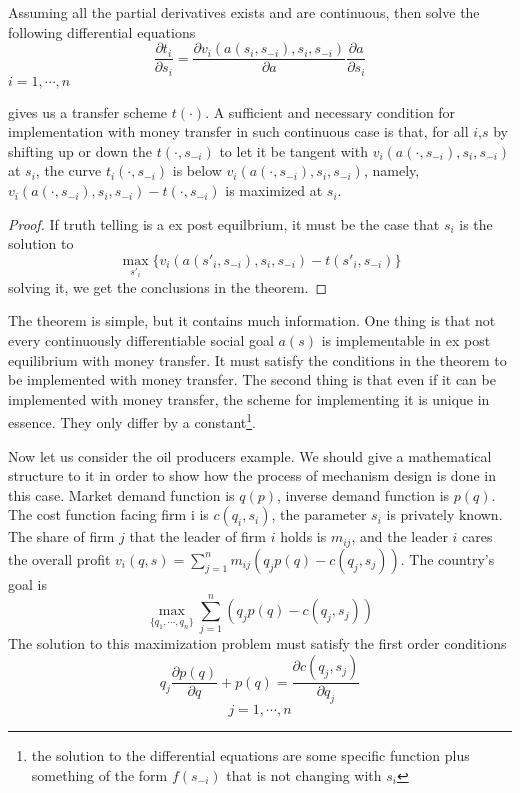 \begin{thm}
Assuming all the partial derivatives exists and are continuous, then solve the following 
differential equations
 $$\frac{\partial t_i}{\partial s_i} = \frac{\partial v_i(a(s_i,s_{-i}),s_i,s_{-i})}{\partial a } \frac{\partial a}{\partial s_i}$$
 $i=1,\cdots,n$ 
 
 gives us a transfer scheme $t(\cdot)$.
A sufficient and necessary condition for implementation with money transfer in such continuous case is that, for all $i$,$s$
by shifting up or down the $t(\cdot,s_{-i})$ to let it be tangent with $ v_i(a(\cdot,s_{-i}),s_i,s_{-i})$ at $s_i$, the curve
$t_i(\cdot,s_{-i})$ is below $ v_i(a(\cdot,s_{-i}),s_i,s_{-i})$, namely, $v_i(a(\cdot,s_{-i}),s_i,s_{-i})-t(\cdot,s_{-i})$ is
maximized at $s_i$.

 
\end{thm}
\begin{proof}
 If truth telling is a ex post equilbrium, it must be the case that $s_i$ is the solution to
 $$\max_{s'_i} \{v_i(a(s'_i,s_{-i}),s_i,s_{-i})-t(s'_i,s_{-i})\}$$
 solving it, we get the conclusions in the theorem.
\end{proof}

The theorem is simple, but it contains much information. One thing is that not every continuously differentiable
social goal $a(s)$ is implementable in ex post equilibrium with money transfer. It must satisfy the conditions in the theorem 
to be implemented with money transfer. The second thing is that even if it can be implemented with money transfer, the scheme for 
implementing it is unique in essence. They only differ by a constant\footnote{the solution to the differential equations are some specific
function plus something of the form $f(s_{-i})$ that is not changing with $s_i$}.

Now let us consider the oil producers example. We should give a mathematical structure to it in order to show how the process of mechanism
design is done in this case. Market demand function is $q(p)$, inverse demand function is $p(q)$. The cost function 
facing firm i is $c(q_i,s_i)$, the parameter $s_i$ is privately known. The share of firm $j$
that the leader of firm  $i$ holds is $m_{ij}$, and  the leader $i$ cares the overall profit 
$v_i(q,s)=\sum_{j=1}^{n} m_{ij}(q_jp(q)-c(q_j,s_j))$. The country's goal is 
$$\max_{\{q_1,\cdots,q_n\}}\sum_{j=1}^{n} (q_jp(q)-c(q_j,s_j)) $$
The solution to this maximization problem must satisfy the first order conditions
$$q_j \frac {\partial p(q)}{\partial q}+p(q)=\frac {\partial c(q_j,s_j)}{\partial q_j}$$
$$j=1,\cdots,n$$

